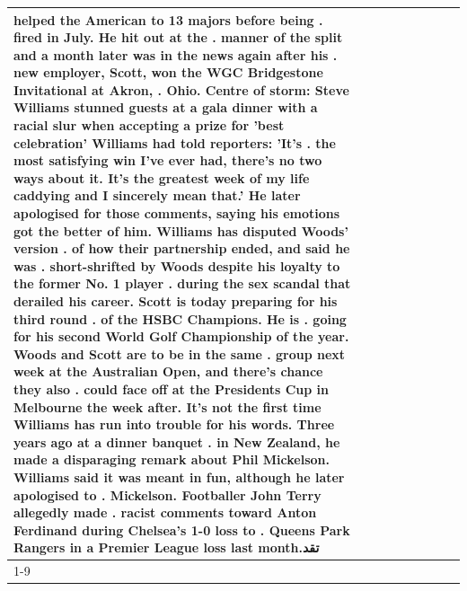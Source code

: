 \begin{table}[H]
\begin{tabular}{lllrlllll}
helped the American to 13 majors before being . fired in July. He hit out at the . manner of the split and a month later was in the news again after his . new employer, Scott, won the WGC Bridgestone Invitational at Akron, . Ohio. Centre of storm: Steve Williams stunned guests at a gala dinner with a racial slur when accepting a prize for 'best celebration' Williams had told reporters: 'It's . the most satisfying win I've ever had, there's no two ways about it. It's the greatest week of my life caddying and I sincerely mean that.' He later apologised for those comments, saying his emotions got the better of him. Williams has disputed Woods' version . of how their partnership ended, and said he was . short-shrifted by Woods despite his loyalty to the former No. 1 player . during the sex scandal that derailed his career. Scott is today preparing for his third round . of the HSBC Champions. He is . going for his second World Golf Championship of the year. Woods and Scott are to be in the same . group next week at the Australian Open, and there's chance they also . could face off at the Presidents Cup in Melbourne the week after. It's not the first time Williams has run into trouble for his words. Three years ago at a dinner banquet . in New Zealand, he made a disparaging remark about Phil Mickelson. Williams said it was meant in fun, although he later apologised to . Mickelson. Footballer John Terry allegedly made . racist comments toward Anton Ferdinand during Chelsea's 1-0 loss to . Queens Park Rangers in a Premier League loss last month.تقد \\
\cline{1-9}

\end{tabular}
\end{table}
